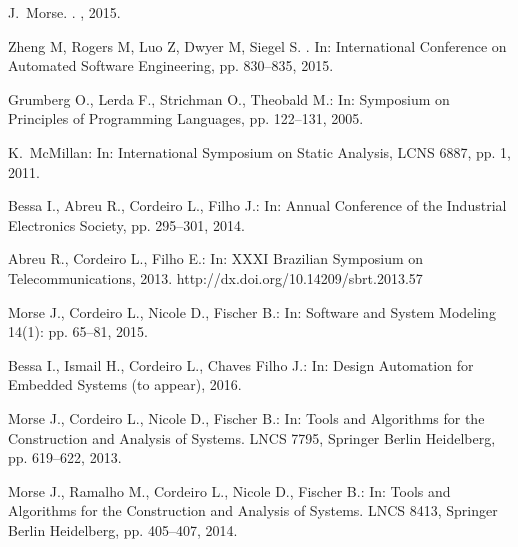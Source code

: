 \documentclass{acm_sen_article}
\begin{document}
{\begin{thebibliography}{1}
J.~Morse.
.
, 2015.

Zheng M, Rogers M, Luo Z, Dwyer M, Siegel S.
.
\newblock In: International Conference on Automated Software Engineering, pp. 830--835, 2015.

Grumberg O., Lerda F., Strichman O., Theobald M.:
\newblock In: Symposium on Principles of Programming Languages, pp. 122--131, 2005.

K.~McMillan:
\newblock In: International Symposium on Static Analysis, LCNS 6887, pp. 1, 2011.

Bessa I., Abreu R., Cordeiro L., Filho J.:
\newblock In: Annual Conference of the Industrial Electronics Society, pp. 295--301, 2014.

Abreu R., Cordeiro L., Filho E.:
\newblock In: XXXI Brazilian Symposium on Telecommunications, 2013.
\newblock http://dx.doi.org/10.14209/sbrt.2013.57

Morse J., Cordeiro L., Nicole D., Fischer B.:
\newblock In: Software and System Modeling 14(1): pp. 65--81, 2015.

Bessa I., Ismail H., Cordeiro L., Chaves Filho J.:
\newblock In: Design Automation for Embedded Systems (to appear), 2016.

Morse J., Cordeiro L., Nicole D., Fischer B.:
\newblock In: Tools and Algorithms for the Construction and Analysis of
  Systems. LNCS 7795, Springer Berlin Heidelberg, pp. 619--622, 2013.

Morse J., Ramalho M., Cordeiro L., Nicole D., Fischer B.:
\newblock In: Tools and Algorithms for the Construction and Analysis of
  Systems. LNCS 8413, Springer Berlin Heidelberg, pp. 405--407, 2014.


\end{thebibliography}}
\end{document}
